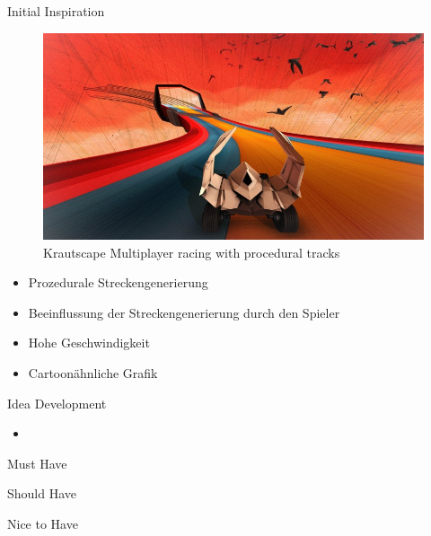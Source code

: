 \slideonetoone
{Initial Inspiration}
{
	\begin{figure}
		\centering
		\includegraphics[width=\textwidth, height=0.7\textheight, keepaspectratio]{images/krautscape_ks1}
		\caption{Krautscape \linebreak Multiplayer racing with procedural tracks}
	\end{figure}
}
{
	\begin{itemize}
		\item Prozedurale Streckengenerierung
		\item Beeinflussung der Streckengenerierung durch den Spieler
		\item Hohe Geschwindigkeit
		\item Cartoonähnliche Grafik
	\end{itemize}
}

\begin{frame}{Idea Development}
	\begin{itemize}
		\item 
	\end{itemize}
\end{frame}

\begin{frame}{Must Have}
\end{frame}

\begin{frame}{Should Have}
\end{frame}

\begin{frame}{Nice to Have}
\end{frame}

%

